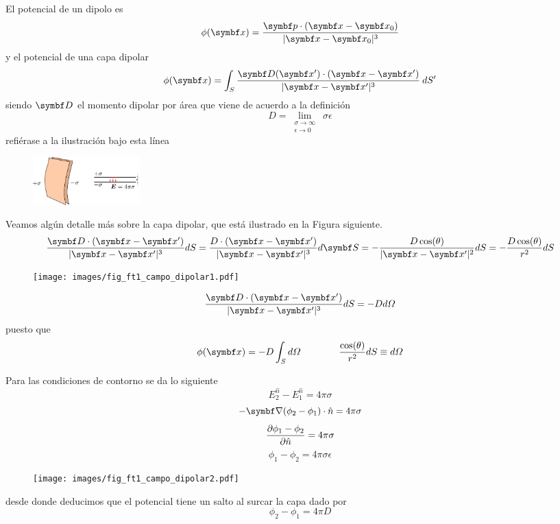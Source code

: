 \documentclass[10pt,oneside]{CBFT_book}
\begin{document}
El potencial de un dipolo es
\[
	\phi(\vb{x}) = \frac{ \vb{p}\cdot(\vb{x}-\vb{x}_0) }{|\vb{x} - \vb{x}_0|^3} 
\]
y el potencial de una capa dipolar
\[
	\phi(\vb{x}) = \int_S \frac{ \vb{D}(\vb{x}')\cdot(\vb{x}-\vb{x}') }{|\vb{x} - \vb{x}'|^3} \: dS'
\]
siendo $\vb{D}$ el momento dipolar por área que viene de acuerdo a la definición
\[
	D = \lim_{\substack{\sigma\to\infty \\ \epsilon\to 0}} \: \sigma\epsilon
\]
refiérase a la ilustración bajo esta línea
\begin{figure}[htb]
	\begin{center}
	\includegraphics[width=0.2\textwidth]{images/fig_ft1_campo_dipolar3.pdf}	 
	\end{center}
	\caption{}
\end{figure}

Veamos algún detalle más sobre la capa dipolar, que está ilustrado en la Figura siguiente.
\[
	\frac{ \vb{D}\cdot(\vb{x}-\vb{x}')}{|\vb{x} - \vb{x}'|^3} dS = 
	\frac{ D \cdot(\vb{x}-\vb{x}')}{|\vb{x} - \vb{x}'|^3} d\vb{S} = 
	- \frac{ D \cos(\theta)}{|\vb{x} - \vb{x}'|^2} dS = 
	- \frac{ D \cos(\theta)}{r^2} dS  
\]

\begin{figure}[htb]
	\begin{center}
	\texttt{[image: images/fig\_ft1\_campo\_dipolar1.pdf]}	 
	\end{center}
	\caption{}
\end{figure}

\[
	\frac{ \vb{D}\cdot(\vb{x}-\vb{x}')}{|\vb{x} - \vb{x}'|^3} dS = - D d\Omega
\]
puesto que
\[
	\phi(\vb{x}) = -D \int_S d\Omega \qquad \qquad \frac{\cos(\theta)}{r^2}dS \equiv d\Omega
\]

Para las condiciones de contorno se da lo siguiente
\[
	E_2^{\hat{n}} - E_1^{\hat{n}} = 4\pi\sigma
\]
\[
	- \Nabla (\phi_2 - \phi_1)\cdot \hat{n} = 4\pi\sigma
\]
\[
	\frac{\partial^{\hspace{-0.05em}} {\phi_1 - \phi_2}}{\partial {\hat{n}}^{\hspace{-0.05em}}} = 4\pi\sigma
\]
\[
	\phi_1 - \phi_2 = 4\pi\sigma\epsilon
\]

\begin{figure}[htb]
	\begin{center}
	\texttt{[image: images/fig\_ft1\_campo\_dipolar2.pdf]}	 
	\end{center}
	\caption{}
\end{figure}

desde donde deducimos que el potencial tiene un salto al surcar la capa dado por 
\[
	\phi_2 - \phi_1 = 4\pi D
\]
\end{document}
